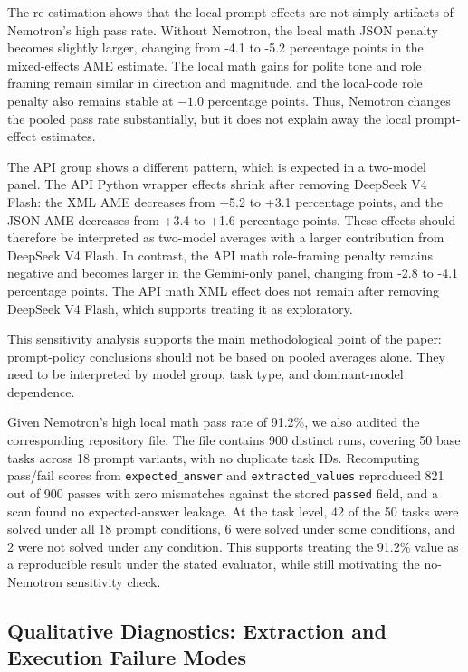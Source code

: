 \documentclass[a4paper,fleqn]{cas-sc}
\begin{document}
The re-estimation shows that the local prompt effects are not simply artifacts of Nemotron's high pass rate. Without Nemotron, the local math JSON penalty becomes slightly larger, changing from -4.1 to -5.2 percentage points in the mixed-effects AME estimate. The local math gains for polite tone and role framing remain similar in direction and magnitude, and the local-code role penalty also remains stable at $-1.0$ percentage points. Thus, Nemotron changes the pooled pass rate substantially, but it does not explain away the local prompt-effect estimates.

The API group shows a different pattern, which is expected in a two-model panel. The API Python wrapper effects shrink after removing DeepSeek V4 Flash: the XML AME decreases from +5.2 to +3.1 percentage points, and the JSON AME decreases from +3.4 to +1.6 percentage points. These effects should therefore be interpreted as two-model averages with a larger contribution from DeepSeek V4 Flash. In contrast, the API math role-framing penalty remains negative and becomes larger in the Gemini-only panel, changing from -2.8 to -4.1 percentage points. The API math XML effect does not remain after removing DeepSeek V4 Flash, which supports treating it as exploratory.

This sensitivity analysis supports the main methodological point of the paper: prompt-policy conclusions should not be based on pooled averages alone. They need to be interpreted by model group, task type, and dominant-model dependence.

Given Nemotron's high local math pass rate of 91.2\%, we also audited the corresponding repository file. The file contains 900 distinct runs, covering 50 base tasks across 18 prompt variants, with no duplicate task IDs. Recomputing pass/fail scores from \texttt{expected\_answer} and \texttt{extracted\_values} reproduced 821 out of 900 passes with zero mismatches against the stored \texttt{passed} field, and a scan found no expected-answer leakage. At the task level, 42 of the 50 tasks were solved under all 18 prompt conditions, 6 were solved under some conditions, and 2 were not solved under any condition. This supports treating the 91.2\% value as a reproducible result under the stated evaluator, while still motivating the no-Nemotron sensitivity check.

\subsection{Qualitative Diagnostics: Extraction and Execution Failure Modes}\label{error-and-failure-modes}
\end{document}
